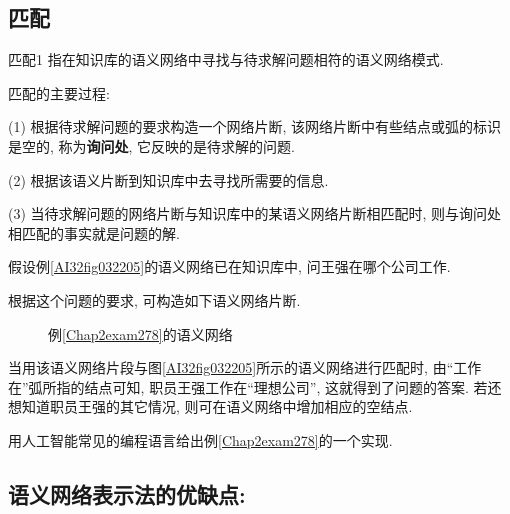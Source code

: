 \subsection{匹配}
\begin{mydef}{匹配}{1}
    指在知识库的语义网络中寻找与待求解问题相符的语义网络模式.
\end{mydef}匹配的主要过程:

    (1) 根据待求解问题的要求构造一个网络片断, 该网络片断中有些结点或弧的标识是空的, 称为\textbf{询问处}, 它反映的是待求解的问题.

    (2) 根据该语义片断到知识库中去寻找所需要的信息.

    (3) 当待求解问题的网络片断与知识库中的某语义网络片断相匹配时, 则与询问处相匹配的事实就是问题的解.
\begin{example}\label{Chap2exam278}
    假设例\ref{AI32fig032205}的语义网络已在知识库中, 问王强在哪个公司工作.
\end{example}

    根据这个问题的要求, 可构造如下语义网络片断.
\begin{figure}[H]
\begin{center}
\caption{例\ref{Chap2exam278}的语义网络}
\label{AI32fig105}
\end{center}
\end{figure}
    当用该语义网络片段与图\ref{AI32fig032205}所示的语义网络进行匹配时, 由“工作在”弧所指的结点可知, 职员王强工作在“理想公司”, 这就得到了问题的答案.
若还想知道职员王强的其它情况, 则可在语义网络中增加相应的空结点.

\begin{think}
    用人工智能常见的编程语言给出例\ref{Chap2exam278}的一个实现.
\end{think}
\subsection{语义网络表示法的优缺点:}
    
